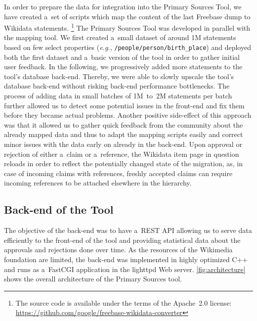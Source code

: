 \documentclass{acm_proc_article-sp}
\begin{document}
In order to prepare the data for integration into the Primary Sources Tool,
we have created a~set of scripts which map the content
of the last Freebase dump to Wikidata statements.%
\footnote{The source code is available under the terms of the Apache~2.0 license:
\url{https://github.com/google/freebase-wikidata-converter}}
The Primary Sources Tool was developed in parallel with the mapping tool.
We first created a~small dataset of around 1M statements
based on few select properties (\emph{e.g.}, \texttt{/people/person/birth\_place})
and deployed both the first dataset and a~basic version of the tool
in order to gather initial user feedback.
In the following, we progressively added more statements to the tool's database back-end.
Thereby, we were able to slowly upscale the tool's database back-end
without risking back-end performance bottlenecks.
The process of adding data in small batches of 1M~to~2M statements per batch
further allowed us to detect some potential issues in the front-end
and fix them before they became actual problems.
Another positive side-effect of this approach was that it allowed us to gather quick feedback
from the community about the already mapped data and thus to adapt the mapping scripts easily
and correct minor issues with the data early on already in the back-end.
Upon approval or rejection of either a~claim or a~reference,
the Wikidata item page in question reloads in order to reflect
the potentially changed state of the migration, as,
in case of incoming claims with references, freshly accepted claims 
can require incoming references to be attached elsewhere in the hierarchy. 

\subsection{Back-end of the Tool}

The objective of the back-end was to have a~REST API allowing us
to serve data efficiently to the front-end of the tool and
providing statistical data about the approvals and rejections done over time.
As the resources of the Wikimedia foundation are limited,
the back-end was implemented in highly optimized C++
and runs as a~FastCGI application in the lighttpd Web server.
\autoref{fig:architecture} shows the overall architecture of the Primary Sources tool.
\end{document}
